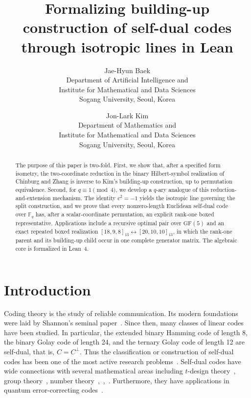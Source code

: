 \documentclass[12pt]{article}
\newcommand{\F}{\mathbb{F}}
\newcommand{\GF}[1]{\ensuremath{\mathrm{GF}(#1)}}
\begin{document}
\title{Formalizing building-up construction of self-dual codes through isotropic lines in Lean}

\author{
Jae-Hyun Baek \\
Department of Artificial Intelligence and \\
Institute for Mathematical and Data Sciences \\
Sogang University, Seoul, Korea
\and
Jon-Lark Kim\\
Department of Mathematics and\\
Institute for Mathematical and Data Sciences \\
Sogang University, Seoul, Korea
}

\maketitle

\begin{abstract}
The purpose of this paper is two-fold. First, we show that, after a specified
form isometry, the two-coordinate reduction in the binary Hilbert-symbol
realization of Chinburg and Zhang is inverse to Kim's building-up construction,
up to permutation equivalence. Second,
for \(q\equiv1\pmod4\), we develop a \(q\)-ary analogue of this
reduction-and-extension mechanism. The identity \(c^2=-1\) yields the
isotropic line governing the split construction, and we prove that every
nonzero-length Euclidean self-dual code over \(\F_q\) has, after a
scalar-coordinate permutation, an explicit rank-one boxed representative.
Applications include a recursive optimal pair over \(\GF{5}\) and an exact
repeated boxed realization
\([18,9,8]_{13}\leftrightarrow[20,10,10]_{13}\), in which the rank-one
parent and its building-up child occur in one complete generator matrix.
The algebraic core is formalized in Lean~4.
\end{abstract}




\section{Introduction}
\label{sec:intro}

Coding theory is the study of reliable communication. Its modern foundations
were laid by Shannon's seminal paper~\cite{Sha}. Since then, many classes of
linear codes have been studied. In particular, the extended binary Hamming
code of length 8, the binary Golay code of length 24, and the ternary Golay
code of length 12 are self-dual, that is, $C = C^{\perp}$.
Thus the classification or construction of self-dual codes has been one of the most active research problems~\cite{self-dual}.
Self-dual codes have wide connections with several mathematical areas including $t$-design theory~\cite{BacGab}, group theory~\cite{ConSlo}, number theory~\cite{BaDou},~\cite{ConSlo},~\cite{ShiChoShaSol}. Furthermore, they have applications in quantum error-correcting codes~\cite{CRSS}.
\end{document}
